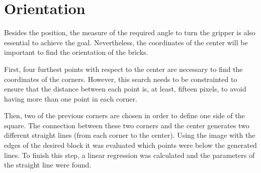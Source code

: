 \section{Orientation}
Besides the position, the measure of the required angle to turn the gripper is also essential to achieve the goal. Nevertheless, the coordinates of the center will be important to find the orientation of the bricks. 

First, four furthest points with respect to the center are necessary to find the coordinates of the corners. However, this search needs to be constrainted to ensure that the distance between each point is, at least, fifteen pixels, to avoid having more than one point in each corner.

Then, two of the previous corners are chosen in order to define one side of the square. The connection between these two corners and the center generates two different straight lines (from each corner to the center). Using the image with the edges of the desired block it was evaluated which points were below the generated lines. To finish this step, a linear regression was calculated and the parameters of the straight line were found.

